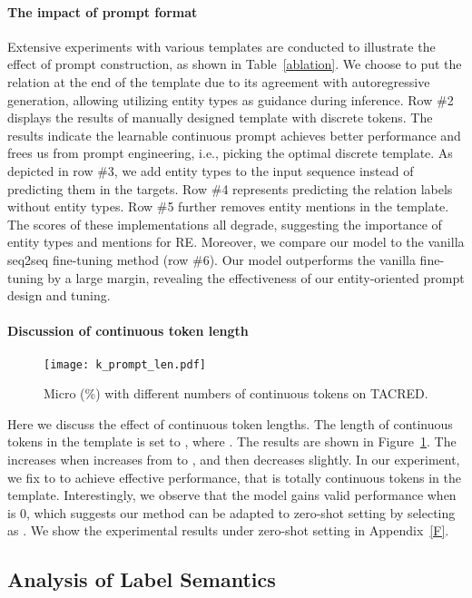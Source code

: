 \documentclass[11pt]{article}
\begin{document}
\paragraph{The impact of prompt format} 
Extensive experiments with various templates are conducted to illustrate the effect of prompt construction, as shown in Table~\ref{ablation}. We choose to put the relation at the end of the template due to its agreement with autoregressive generation, allowing utilizing entity types as guidance during inference.
Row \#2 displays the results of manually designed template with discrete tokens. 
The results indicate the learnable continuous prompt achieves better performance and frees us from prompt engineering, i.e., picking the optimal discrete template.
As depicted in row \#3, we add entity types to the input sequence instead of predicting them in the targets. Row \#4 represents predicting the relation labels without entity types. 
Row \#5 further removes entity mentions in the template. 
The  scores of these implementations all degrade, suggesting the importance of entity types and mentions for RE. Moreover, we compare our model to the vanilla seq2seq fine-tuning method (row \#6). Our model outperforms the vanilla fine-tuning by a large margin, revealing the effectiveness of our entity-oriented prompt design and tuning.
\paragraph{Discussion of continuous token length}

\begin{figure}[t]
\centering
\texttt{[image: k\_prompt\_len.pdf]}
\caption{Micro  (\%) with different numbers of continuous tokens on TACRED.}
\label{prompt_len} 
\end{figure}

Here we discuss the effect of continuous token lengths. The length of continuous tokens in the template  is set to , where . The results are shown in Figure~\ref{prompt_len}. The  increases when  increases from  to , and then decreases slightly. In our experiment, we fix  to  to achieve effective performance, that is totally  continuous tokens in the template. Interestingly, we observe that the model gains valid performance when  is 0, which suggests our method can be adapted to zero-shot setting by selecting  as . We show the experimental results under zero-shot setting in Appendix~\ref{F}.
\subsection{Analysis of Label Semantics}
\end{document}
